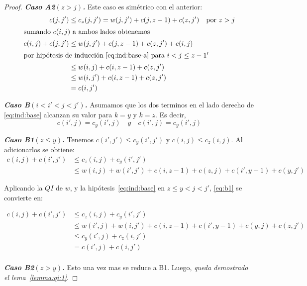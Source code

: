 \documentclass[spanish]{llncs}
\begin{document}
\begin{proof}
	\textbf{\emph{Caso A2\;$(z > j)$.}} Este caso es simétrico con el anterior:
	\begin{align*}
		c(j,j')          & \le c_z(j,j') = w(j,j') + c(j,z-1) + c(z,j') & \text{por $z > j$} \\
		\intertext{sumando $c(i,j)$ a ambos lados obtenemos}
		c(i,j) + c(j,j') & \le w(j,j') + c(j,z-1) + c(z,j') + c(i,j)    &                    \\
		\intertext{por hipótesis de inducción \eqref{eq:ind:base-a} para $i < j \le z-1'$}
		                 & \le w(i,j) + c(i,z-1) + c(z,j')              &                    \\
		                 & \le w(i,j') + c(i,z-1) + c(z,j')             &                    \\
		                 & =c(i,j')                                     &                    
	\end{align*}
																		
	\textbf{\emph{Caso B\;$(i < i' < j < j')$.}} Asumamos que los dos terminos en el lado
	derecho de \eqref{eq:ind:base} alcanzan su valor para $k=y$ y $k=z$. Es decir,
	$$c(i',j) = c_y(i',j) \quad y \quad c(i',j) = c_y(i',j)$$
																		
	\textbf{\emph{Caso B1\;$(z \le y)$.}} Tenemos $c(i',j') \le c_y(i',j')$ y $c(i,j) \le c_z(i,j)$.
	Al adicionarlos se obtiene:
	\begin{equation}
		\label{eq:b1}
		\begin{split}
			c(i,j) + c(i',j') & \le c_z(i,j) + c_y(i',j')                                       \\
			& \le w(i,j) + w(i',j') + c(i,z-1) + c(z,j) + c(i',y-1) + c(y,j')
		\end{split}
	\end{equation}
														
	Aplicando la $QI$ de $w$, y la hipótesis~\eqref{eq:ind:base} en $z \le y < j < j'$,
	\eqref{eq:b1} se convierte en:
														
	\begin{align*}
		c(i,j) + c(i',j') & \le c_z(i,j) + c_y(i',j')                                       \\
		                  & \le w(i',j) + w(i,j') + c(i,z-1) + c(i',y-1) + c(y,j) + c(z,j') \\
		                  & \le c_y(i',j) + c_z(i,j')                                       \\
		                  & = c(i',j) + c(i,j')                                             \\
	\end{align*}
										
	\textbf{\emph{Caso B2\;$(z > y)$.}} Esto una vez mas se reduce a B1. Luego,
	\emph{queda demostrado el lema~\ref{lemma:qi:1}}.
\end{proof}
\end{document}
